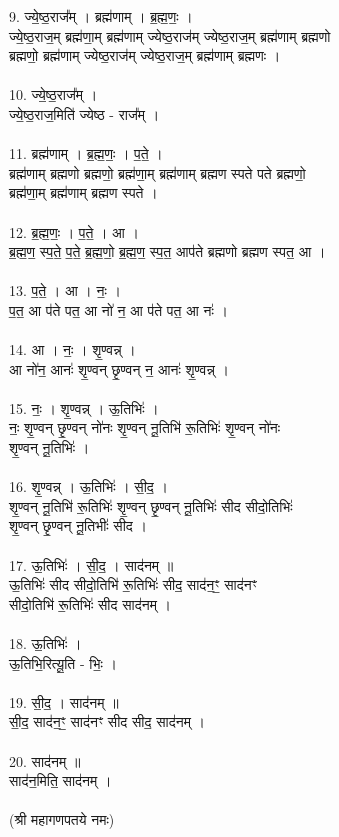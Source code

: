 9. ज्ये॒ष्ठ॒राज᳚म् । ब्रह्म॑णाम् । ब्र॒ह्म॒णः॒ ।\\
ज्ये॒ष्ठ॒राज॒म् ब्रह्म॑णा॒म् ब्रह्म॑णाम् ज्येष्ठ॒राज॑म् ज्येष्ठ॒राज॒म् ब्रह्म॑णाम् ब्रह्मणो\\
ब्रह्मणो॒ ब्रह्म॑णाम् ज्येष्ठ॒राज॑म् ज्येष्ठ॒राज॒म् ब्रह्म॑णाम् ब्रह्मणः ।\\
\\
10. ज्ये॒ष्ठ॒राज᳚म् ।\\
ज्ये॒ष्ठ॒राज॒मिति॑ ज्येष्ठ - राज᳚म् ।\\
\\
11. ब्रह्म॑णाम् । ब्र॒ह्म॒णः॒ । प॒ते॒ ।\\
ब्रह्म॑णाम् ब्रह्मणो ब्रह्मणो॒ ब्रह्म॑णा॒म् ब्रह्म॑णाम् ब्रह्मण स्पते पते ब्रह्मणो॒\\
ब्रह्म॑णा॒म् ब्रह्म॑णाम् ब्रह्मण स्पते ।\\
\\
12. ब्र॒ह्म॒णः॒ । प॒ते॒ । आ ।\\
ब्र॒ह्म॒ण॒ स्प॒ते॒ प॒ते॒ ब्र॒ह्म॒णो॒ ब्र॒ह्म॒ण॒ स्प॒त॒ आप॑ते ब्रह्मणो ब्रह्मण स्पत॒ आ ।\\
\\
13. प॒ते॒ । आ । नः॒ ।\\
प॒त॒ आ प॑ते पत॒ आ नो॑ न॒ आ प॑ते पत॒ आ नः॑ ।\\
\\
14. आ । नः॒ । शृ॒ण्वन्न् ।\\
आ नो॑न॒ आनः॑ शृ॒ण्वन् छृ॒ण्वन् न॒ आनः॑ शृ॒ण्वन्न् ।\\
\\
15. नः॒ । शृ॒ण्वन्न् । ऊ॒तिभिः॑ ।\\
नः॒ शृ॒ण्वन् छृ॒ण्वन् नो॑नः शृ॒ण्वन् नू॒तिभि॑ रू॒तिभिः॑ शृ॒ण्वन् नो॑नः\\
शृ॒ण्वन् नू॒तिभिः॑ ।\\
\\
16. शृ॒ण्वन्न् । ऊ॒तिभिः॑ । सी॒द॒ ।\\
शृ॒ण्वन् नू॒तिभि॑ रू॒तिभिः॑ शृ॒ण्वन् छृ॒ण्वन् नू॒तिभिः॑ सीद सीदो॒तिभिः॑\\
शृ॒ण्वन् छृ॒ण्वन् नू॒तिभीः॑ सीद ।\\
\\
17. ऊ॒तिभिः॑ । सी॒द॒ । साद॑नम् ॥\\
ऊ॒तिभिः॑ सीद सीदो॒तिभि॑ रू॒तिभिः॑ सीद॒ साद॑न॒ꣳ॒ साद॑नꣳ\\
सीदो॒तिभि॑ रू॒तिभिः॑ सीद साद॑नम् ।\\
\\
18. ऊ॒तिभिः॑ ।\\
ऊ॒तिभि॒रित्यू॒ति - भिः॒ ।\\
\\
19. सी॒द॒ । साद॑नम् ॥\\
सी॒द॒ साद॑न॒ꣳ॒ साद॑नꣳ सीद सीद॒ साद॑नम् ।\\
\\
20. साद॑नम् ॥\\
साद॑न॒मिति॒ साद॑नम् ।\\
\\
(श्री महागणपतये नमः)\\
